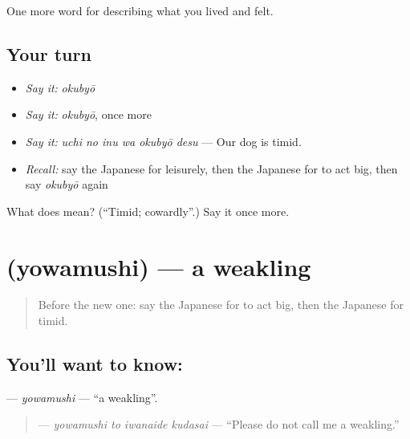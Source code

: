 \begin{grammarlens}[title={What you've built}]
One more word for describing what you lived and felt.
\end{grammarlens}

\subsection*{Your turn}
\begin{itemize}
\raggedright
  \item \emph{Say it:} \emph{okubyō}
  \item \emph{Say it:} \emph{okubyō}, once more
  \item \emph{Say it:} \emph{uchi no inu wa okubyō desu} — Our dog is timid.
  \item \emph{Recall:} say the Japanese for leisurely, then the Japanese for to act big, then say \emph{okubyō} again
\end{itemize}

\begin{tcolorbox}[breakable,colback=teal!4,colframe=teal!35!black,title={Before you move on}]
What does  mean? (\textquotedblleft{}Timid; cowardly\textquotedblright{}.) Say it once more.
\end{tcolorbox}
\section[\texorpdfstring{\ja{よわむし} (yowamushi)}{よわむし (yowamushi)}]{ (yowamushi) — a weakling}

\label{lesson:JA-C439-yowamushi}



\begin{quote}
Before the new one: say the Japanese for to act big, then the Japanese for timid.
\end{quote}

\subsection*{You'll want to know: }
\textbf{} — \emph{yowamushi} — \textquotedblleft{}a weakling\textquotedblright{}.

\begin{quote}
\textbf{  } — \emph{yowamushi to iwanaide kudasai} — \textquotedblleft{}Please do not call me a weakling.\textquotedblright{}
\end{quote}

